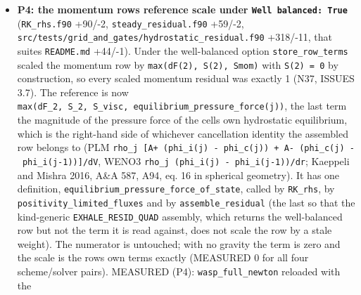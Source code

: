 \documentclass[english,a4paper]{my_memo}
\begin{document}
\begin{itemize}
  \texttt{attempted\_step} 71/0 unchanged. Impact: the \texttt{wasp\_full\_newton} reload ends
  \texttt{info\ =\ 0}, \texttt{\textbar{}\textbar{}R\textbar{}\textbar{}} 1.667e-09, flux spread 6.233e-14, 8 outer iterations,
  \texttt{log10\ Mdot} 13.30 on both binaries, the certification block line for line
  identical, every output byte-identical but the provenance line of the two
  \texttt{Hydro\_ioniz*} files and one extra \texttt{loop-top\ stop:} line in the log; the
  \texttt{carrier\_elem\_newton} reload at cap 40 gives every \texttt{(JFNK)} line identical
  because the gate is never met on that reload. No golden can move: READ from
  the ten \texttt{DEFAULT\_CASES}, none of their golden logs carries a \texttt{(JFNK)\ start}
  or \texttt{(PTC)\ start} line at all.
\item
  \textbf{P4: the momentum row\textquotesingle s reference scale under \texttt{Well\ balanced:\ True}}
  (\texttt{RK\_rhs.f90} +90/-2, \texttt{steady\_residual.f90} +59/-2,
  \texttt{src/tests/grid\_and\_gates/hydrostatic\_residual.f90} +318/-11, that suite\textquotesingle s
  \texttt{README.md} +44/-1). Under the well-balanced option \texttt{store\_row\_terms} scaled the momentum row by
  \texttt{max(\textbar{}dF(2)\textbar{},\ \textbar{}S(2)\textbar{},\ \textbar{}Smom\textbar{})} with \texttt{S(2)\ =\ 0} by construction, so every
  scaled momentum residual was exactly 1 (N37, ISSUES 3.7). The reference is
  now \texttt{max(\textbar{}dF\_2\textbar{},\ \textbar{}S\_2\textbar{},\ \textbar{}S\_visc\textbar{},\ equilibrium\_pressure\_force(j))}, the last
  term the magnitude of the pressure force of the cell\textquotesingle s own hydrostatic
  equilibrium, which is the right-hand side of whichever cancellation
  identity the assembled row belongs to (PLM
  \texttt{\textbar{}rho\_j\ {[}A+\ (phi\_i(j)\ -\ phi\_c(j))\ +\ A-\ (phi\_c(j)\ -\ phi\_i(j-1)){]}\textbar{}/dV}, WENO3
  \texttt{\textbar{}rho\_j\ (phi\_i(j)\ -\ phi\_i(j-1))\textbar{}/dr}; Kaeppeli and Mishra 2016, A\&A 587,
  A94, eq. 16 in spherical geometry). It has one definition,
  \texttt{equilibrium\_pressure\_force\_of\_state}, called by \texttt{RK\_rhs}, by
  \texttt{positivity\_limited\_fluxes} and by \texttt{assemble\_residual} (the last so that
  the kind-generic \texttt{EXHALE\_RESID\_QUAD} assembly, which returns the well-balanced
  row but not the term it is read against, does not scale the row by a stale
  weight). The numerator is untouched; with no gravity the term is zero and
  the scale is the row\textquotesingle s own terms exactly (MEASURED 0 for all four
  scheme/solver pairs). MEASURED (P4): \texttt{wasp\_full\_newton} reloaded with the

\end{itemize}
\end{document}
